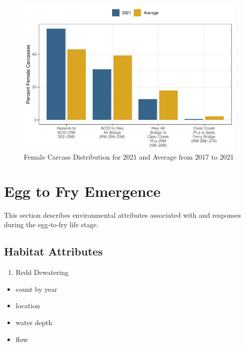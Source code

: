 \documentclass[
]{book}
\providecommand{\tightlist}{%
  \setlength{\itemsep}{0pt}\setlength{\parskip}{0pt}}
\theoremstyle{definition}
\theoremstyle{definition}
\theoremstyle{definition}
\theoremstyle{definition}
\theoremstyle{remark}
\begin{document}
\begin{figure}
\centering
\includegraphics{_main_files/figure-latex/carcassdistrib-fig-1.pdf}
\caption{\label{fig:carcassdistrib-fig}Female Carcass Distribution for 2021 and Average from 2017 to 2021}
\end{figure}

\hypertarget{egg-to-fry-emergence}{%
\chapter{Egg to Fry Emergence}\label{egg-to-fry-emergence}}

This section describes environmental attributes associated with and responses during the egg-to-fry life stage.

\hypertarget{habitat-attributes-1}{%
\section{Habitat Attributes}\label{habitat-attributes-1}}

\begin{enumerate}
\def\labelenumi{\arabic{enumi}.}
\tightlist
\item
  Redd Dewatering
\end{enumerate}

\begin{itemize}
\tightlist
\item
  count by year
\item
  location
\item
  water depth
\item
  flow
\end{itemize}
\end{document}
